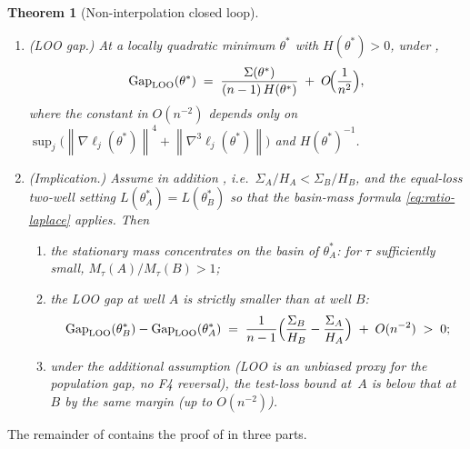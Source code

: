 \documentclass[11pt,a4paper]{article}
\newtheorem{theorem}{Theorem}[section]
\theoremstyle{definition}
\theoremstyle{remark}
\newcommand{\Gap}{\mathrm{Gap}}
\newcommand{\LOO}{\mathrm{LOO}}
\newcommand{\norm}[1]{\left\|#1\right\|}
\begin{document}
\begin{theorem}[Non-interpolation closed loop]
\begin{enumerate}[label=\textnormal{(\Roman*)},leftmargin=2.6em]
\begin{equation}
          \;=\; \frac{\Sigma_B}{\Sigma_A}\,
                \exp\!\Bigl(-\tfrac{2}{\tau}\bigl(U(\theta_A^*)
                                                -U(\theta_B^*)\bigr)\Bigr).
       \end{equation}
   \item \emph{(LOO gap.)}  At a locally quadratic minimum
       $\theta^*$ with $H(\theta^*)>0$, under ,
       \begin{equation}\label{eq:LOO-gap}
          \Gap_{\LOO}(\theta^*) \;=\;
              \frac{\Sigma(\theta^*)}{(n-1)\,H(\theta^*)}
              \;+\; O\!\Bigl(\frac{1}{n^2}\Bigr),
       \end{equation}
       where the constant in $O(n^{-2})$ depends only on
       $\sup_{j}\bigl(\norm{\nabla \ell_j(\theta^*)}^4 +
       \norm{\nabla^3 \ell_j(\theta^*)}\bigr)$ and $H(\theta^*)^{-1}$.
   \item \emph{(Implication.)}  Assume in addition , i.e.\
       $\Sigma_A/H_A < \Sigma_B/H_B$, and the equal-loss two-well setting
       $L(\theta_A^*) = L(\theta_B^*)$ so that the basin-mass formula
       \eqref{eq:ratio-laplace} applies.  Then
       \begin{enumerate}[label=\textnormal{(\roman*)}]
       \item the stationary mass concentrates on the basin of $\theta_A^*$:
           for $\tau$ sufficiently small,
           $M_\tau(A)/M_\tau(B) > 1$;
       \item the LOO gap at well $A$ is strictly smaller than at well $B$:
           \begin{equation}\label{eq:gap-margin}
              \Gap_{\LOO}(\theta_B^*) - \Gap_{\LOO}(\theta_A^*)
              \;=\; \frac{1}{n-1}\Bigl(
                       \frac{\Sigma_B}{H_B} - \frac{\Sigma_A}{H_A}\Bigr)
                  \;+\; O(n^{-2}) \;>\; 0;
           \end{equation}
       \item under the additional assumption 
           (LOO is an unbiased proxy for the population gap, no F4
           reversal), the test-loss bound at~$A$ is below that at~$B$
           by the same margin (up to $O(n^{-2})$).
       \end{enumerate}
   \end{enumerate}
\end{theorem}

The remainder of  contains the
proof of \Cref{thm:closed-loop} in three parts.
\end{document}

